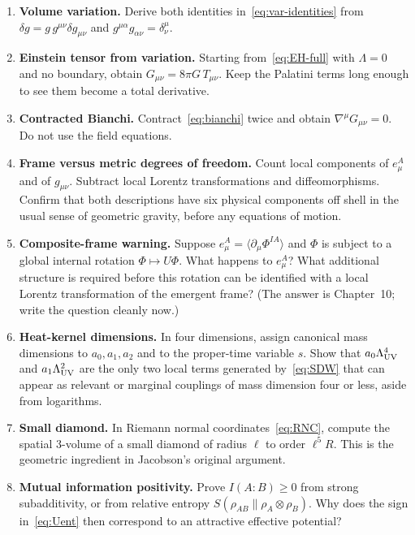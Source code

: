\begin{enumerate}
  \item \textbf{Volume variation.}
    Derive both identities in~\eqref{eq:var-identities} from
    \(\delta g=g\,g^{\mu\nu}\delta g_{\mu\nu}\) and
    \(g^{\mu\alpha}g_{\alpha\nu}=\delta^\mu_\nu\).
  \item \textbf{Einstein tensor from variation.}
    Starting from~\eqref{eq:EH-full} with \(\Lambda=0\) and no
    boundary, obtain \(G_{\mu\nu}=8\pi G\,T_{\mu\nu}\). Keep the
    Palatini terms long enough to see them become a total derivative.
  \item \textbf{Contracted Bianchi.}
    Contract~\eqref{eq:bianchi} twice and obtain
    \(\nabla^\mu G_{\mu\nu}=0\). Do not use the field equations.
  \item \textbf{Frame versus metric degrees of freedom.}
    Count local components of \(e^A_\mu\) and of \(g_{\mu\nu}\).
    Subtract local Lorentz transformations and diffeomorphisms. Confirm
    that both descriptions have six physical components off shell in
    the usual sense of geometric gravity, before any equations of
    motion.
  \item \textbf{Composite-frame warning.}
    Suppose \(e^A_\mu=\langle\partial_\mu\Phi^{IA}\rangle\) and
    \(\Phi\) is subject to a global internal rotation
    \(\Phi\mapsto U\Phi\). What happens to \(e^A_\mu\)? What additional
    structure is required before this rotation can be identified with
    a local Lorentz transformation of the emergent frame? (The answer
    is Chapter~10; write the question cleanly now.)
  \item \textbf{Heat-kernel dimensions.}
    In four dimensions, assign canonical mass dimensions to
    \(a_0,a_1,a_2\) and to the proper-time variable \(s\). Show that
    \(a_0\Lambda_{\mathrm{UV}}^4\) and \(a_1\Lambda_{\mathrm{UV}}^2\) are the only two local terms
    generated by~\eqref{eq:SDW} that can appear as relevant or
    marginal couplings of mass dimension four or less, aside from
    logarithms.
  \item \textbf{Small diamond.}
    In Riemann normal coordinates~\eqref{eq:RNC}, compute the
    spatial 3-volume of a small diamond of radius \(\ell\) to order
    \(\ell^5 R\). This is the geometric ingredient in Jacobson's
    original argument.
  \item \textbf{Mutual information positivity.}
    Prove \(I(A:B)\ge 0\) from strong subadditivity, or from relative
    entropy \(S(\rho_{AB}\|\rho_A\otimes\rho_B)\). Why does the sign
    in~\eqref{eq:Uent} then correspond to an attractive effective
    potential?
\end{enumerate}

